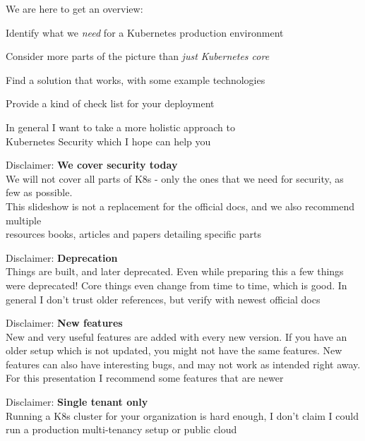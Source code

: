 \documentclass[Screen16to9,17pt]{foils}
\begin{document}

We are here to get an overview:
\begin{list2}
\item Identify what we \emph{need} for a Kubernetes production environment
\item Consider more parts of the picture than \emph{just Kubernetes core}
\item Find a solution that works, with some example technologies
\item Provide a kind of check list for your deployment
\end{list2}

\vskip 5mm
\begin{center}
In general I want to take a more holistic approach to\\
Kubernetes Security which I hope can help you
\end{center}



\begin{list2}
\item Disclaimer: {\bf We cover security today}\\
We will not cover all parts of K8s  - only the ones that we need for security, as few as possible.\\
This slideshow is not a replacement for the official docs, and we also recommend multiple\\ resources books, articles and papers detailing specific parts

\item Disclaimer: {\bf Deprecation}\\
Things are built, and later deprecated. Even while preparing this a few things were deprecated! Core things even change from time to time, which is good. In general I don't trust older references, but verify with newest official docs

\item Disclaimer: {\bf New features}\\
New and very useful features are added with every new version. If you have an older setup which is not updated, you might not have the same features. New features can also have interesting bugs, and may not work as intended right away. For this presentation I recommend some features that are newer

\item Disclaimer: {\bf Single tenant only}\\
Running a K8s cluster for your organization is hard enough, I don't claim I could run a production multi-tenancy setup or public cloud
\end{list2}
\end{document}
